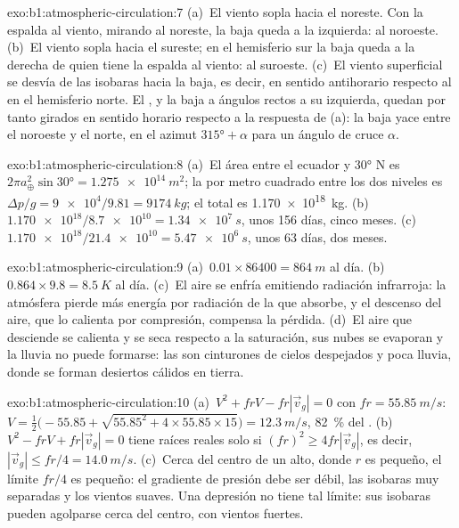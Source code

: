 \begin{solution}{exo:b1:atmospheric-circulation:7}
(a)~El viento sopla hacia el noreste. Con la espalda al viento, mirando al noreste, la baja queda a la izquierda: al noroeste. (b)~El viento sopla hacia el sureste; en el hemisferio sur la baja queda a la derecha de quien tiene la espalda al viento: al suroeste. (c)~El viento superficial se desvía de las isobaras hacia la baja, es decir, en sentido antihorario respecto al  en el hemisferio norte. El , y la baja a ángulos rectos a su izquierda, quedan por tanto girados en sentido horario respecto a la respuesta de (a): la baja yace entre el noroeste y el norte, en el azimut $\ang{315} + \alpha$ para un ángulo de cruce
$\alpha$.
\end{solution}

\begin{solution}{exo:b1:atmospheric-circulation:8}
(a)~El área entre el ecuador y \ang{30} N es $2\pi a_\oplus^2\sin\ang{30} =
\qty{1.275e14}{m^2}$; la  por metro cuadrado entre los dos niveles es
$\Delta p/g = \num{9e4}/9.81 = \qty{9174}{kg}$; el total es
\qty{1.170e18}{kg}. (b)~$\num{1.170e18}/\num{8.7e10} = \qty{1.34e7}{s}$, unos
\num{156} días, cinco meses. (c)~$\num{1.170e18}/\num{21.4e10} = \qty{5.47e6}{s}$,
unos \num{63} días, dos meses.
\end{solution}

\begin{solution}{exo:b1:atmospheric-circulation:9}
(a)~$\num{0.01} \times \num{86400} = \qty{864}{m}$ al día. (b)~$0.864 \times 9.8 =
\qty{8.5}{K}$ al día. (c)~El aire se enfría emitiendo radiación infrarroja: la atmósfera pierde más energía por radiación de la que absorbe, y el descenso del aire, que lo calienta por compresión, compensa la pérdida. (d)~El aire que desciende se calienta y se seca respecto a la saturación, sus nubes se evaporan y la lluvia no puede formarse: las  son cinturones de cielos despejados y poca lluvia, donde se forman desiertos cálidos en tierra.
\end{solution}

\begin{solution}{exo:b1:atmospheric-circulation:10}
(a)~$V^2 + frV - fr|\vec v_g| = 0$ con $fr = \qty{55.85}{m/s}$:
$V = \tfrac12\bigl(-55.85 + \sqrt{55.85^2 + 4 \times 55.85 \times 15}\bigr) =
\qty{12.3}{m/s}$, \qty{82}{\percent} del . (b)~$V^2 - frV +
fr|\vec v_g| = 0$ tiene raíces reales solo si $(fr)^2 \geq 4fr|\vec v_g|$, es decir,
$|\vec v_g| \leq fr/4 = \qty{14.0}{m/s}$. (c)~Cerca del centro de un alto, donde $r$ es
pequeño, el límite $fr/4$ es pequeño: el gradiente de presión debe ser débil, las isobaras muy separadas y los vientos suaves. Una depresión no tiene tal límite: sus isobaras pueden agolparse cerca del centro, con vientos fuertes.
\end{solution}

